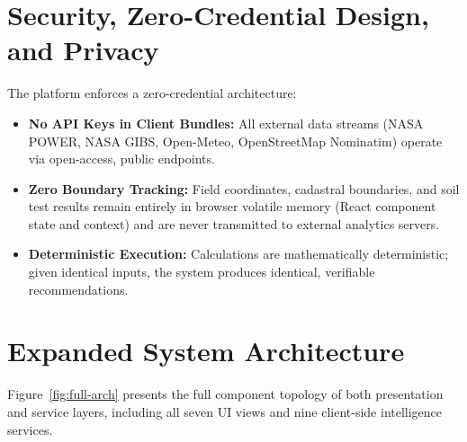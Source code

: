\documentclass[11pt,a4paper]{report}
\begin{document}
\section{Security, Zero-Credential Design, and Privacy}
The platform enforces a zero-credential architecture:
\begin{itemize}
  \item \textbf{No API Keys in Client Bundles:} All external data streams (NASA POWER, NASA GIBS, Open-Meteo, OpenStreetMap Nominatim) operate via open-access, public endpoints.
  \item \textbf{Zero Boundary Tracking:} Field coordinates, cadastral boundaries, and soil test results remain entirely in browser volatile memory (React component state and context) and are never transmitted to external analytics servers.
  \item \textbf{Deterministic Execution:} Calculations are mathematically deterministic; given identical inputs, the system produces identical, verifiable recommendations.
\end{itemize}

\section{Expanded System Architecture}

Figure~\ref{fig:full-arch} presents the full component topology of both presentation and service layers, including all seven UI views and nine client-side intelligence services.
\end{document}
